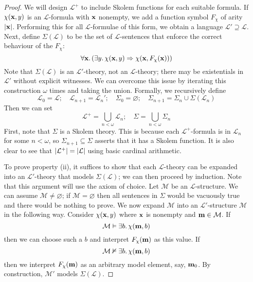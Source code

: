 \begin{proof}
    We will design \( \mathcal L^+ \) to include Skolem functions for each suitable formula.
    If \( \chi(\vb x, y) \) is an \( \mathcal L \)-formula with \( \vb x \) nonempty, we add a function symbol \( F_\chi \) of arity \( \abs{\vb x} \).
    Performing this for all \( \mathcal L \)-formulae of this form, we obtain a language \( \mathcal L' \supseteq \mathcal L \).
    Next, define \( \Sigma(\mathcal L) \) to be the set of \( \mathcal L \)-sentences that enforce the correct behaviour of the \( F_\chi \):
    \[ \forall \vb x.\, (\exists y.\, \chi(\vb x, y) \Rightarrow \chi(\vb x, F_\chi(\vb x))) \]
    Note that \( \Sigma(\mathcal L) \) is an \( \mathcal L' \)-theory, not an \( \mathcal L \)-theory; there may be existentials in \( \mathcal L' \) without explicit witnesses.
    We can overcome this issue by iterating this construction \( \omega \) times and taking the union.
    Formally, we recursively define
    \[ \mathcal L_0 = \mathcal L;\quad \mathcal L_{n+1} = \mathcal L_n';\quad \Sigma_0 = \varnothing; \quad \Sigma_{n+1} = \Sigma_n \cup \Sigma(\mathcal L_n) \]
    Then we can set
    \[ \mathcal L^+ = \bigcup_{n < \omega} \mathcal L_n;\quad \Sigma = \bigcup_{n < \omega} \Sigma_n \]
    First, note that \( \Sigma \) is a Skolem theory.
    This is because each \( \mathcal L^+ \)-formula is in \( \mathcal L_n \) for some \( n < \omega \), so \( \Sigma_{n+1} \subseteq \Sigma \) asserts that it has a Skolem function.
    It is also clear to see that \( \abs{\mathcal L^+} = \abs{\mathcal L} \) using basic cardinal arithmetic.

    To prove property (ii), it suffices to show that each \( \mathcal L \)-theory can be expanded into an \( \mathcal L' \)-theory that models \( \Sigma(\mathcal L) \); we can then proceed by induction.
    Note that this argument will use the axiom of choice.
    Let \( \mathcal M \) be an \( \mathcal L \)-structure.
    We can assume \( \mathcal M \neq \varnothing \); if \( \mathcal M = \varnothing \) then all sentences in \( \Sigma \) would be vacuously true and there would be nothing to prove.
    We now expand \( \mathcal M \) into an \( \mathcal L' \)-structure \( \mathcal M \) in the following way.
    Consider \( \chi(\vb x, y) \) where \( \vb x \) is nonempty and \( \vb m \in \mathcal M \).
    If
    \[ \mathcal M \vDash \exists b.\, \chi(\vb m, b) \]
    then we can choose such a \( b \) and interpret \( F_\chi(\vb m) \) as this value.
    If
    \[ \mathcal M \nvDash \exists b.\, \chi(\vb m, b) \]
    then we interpret \( F_\chi(\vb m) \) as an arbitrary model element, say, \( \vb m_0 \).
    By construction, \( \mathcal M' \) models \( \Sigma(\mathcal L) \).
\end{proof}
